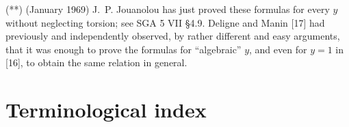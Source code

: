 \medskip

\noindent(**) (January 1969) J.~P. Jouanolou has just proved these formulas
for every $y$ without neglecting torsion; see SGA 5 VII \S{}4.9. Deligne
and Manin [17] had previously and independently observed, by rather
different and easy arguments, that it was enough to prove the formulas for
``algebraic'' $y$, and even for $y=1$ in [16], to obtain the same relation
in general.


\newpage
\section*{Terminological index}
\begingroup\small
